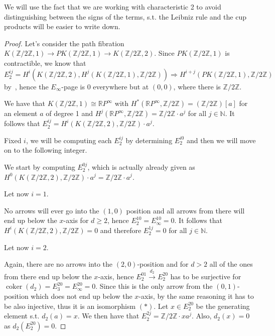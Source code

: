 \documentclass{article}
\newcommand{\numberset}{\mathbb}
\newcommand{\N}{\numberset{N}}
\newcommand{\Z}{\numberset{Z}}
\newcommand{\R}{\numberset{R}}
\newcommand{\RP}{\R P^\infty}
\newcommand{\exercise}[1]{\noindent {\bf Exercise #1}}
\DeclareMathOperator{\coker}{coker}
\begin{document}
\title{}

\author{Matteo Durante, s2303760, Leiden University}

\maketitle

\exercise{2}

    We will use the fact that we are working with characteristic 2 to avoid
    distinguishing between the signs of the terms, s.t. the Leibniz rule and the
    cup products will be easier to write down.

\begin{proof}
    Let's consider the path fibration $K(\Z/2\Z,1)\rightarrow
    PK(\Z/2\Z,1)\rightarrow K(\Z/2\Z,2)$. Since $PK(\Z/2\Z,1)$ is contractible,
    we know that $E^{ij}_2=H^i(K(\Z/2\Z,2),H^j(K(\Z/2\Z,1),\Z/2\Z))\Rightarrow
    H^{i+j}(PK(\Z/2\Z,1),\Z/2\Z)$ by~\cite[thm. 9.5]{HM19}, hence the
    $E_\infty$-page is 0 everywhere but at $(0,0)$, where there is $\Z/2\Z$.

    We have that $K(\Z/2\Z,1)\cong\RP$ with $H^*(\RP,\Z/2\Z)=(\Z/2\Z)[a]$ for an
    element $a$ of degree 1 and $H^j(\RP,\Z/2\Z)=\Z/2\Z\cdot a^j$ for all
    $j\in\N$. It follows that $E^{ij}_2=H^i(K(\Z/2\Z,2),\Z/2\Z)\cdot a^j$.

    Fixed $i$, we will be computing each $E^{ij}_2$ by determining $E^{i0}_2$
    and then we will move on to the following integer.

    We start by computing $E^{0j}_2$, which is actually already given as
    $H^0(K(\Z/2\Z,2),\Z/2\Z)\cdot a^j=\Z/2\Z\cdot a^j$.

    Let now $i=1$.
    
    No arrows will ever go into the $(1,0)$ position and all arrows from there
    will end up below the $x$-axis for $d\geq 2$, hence
    $E^{10}_2=E^{10}_\infty=0$. It follows that $H^i(K(\Z/2\Z,2),\Z/2\Z)=0$ and
    therefore $E^{1j}_2=0$ for all $j\in\N$.

    Let now $i=2$.

    Again, there are no arrows into the $(2,0)$-position and for $d>2$ all of
    the ones from there end up below the $x$-axis, hence
    $E^{01}_2\xrightarrow{d_2}E^{20}_2$ has to be surjective for
    $\coker(d_2)=E^{20}_3=E^{20}_\infty=0$. Since this is the only arrow from
    the $(0,1)$-position which does not end up below the $x$-axis, by the same
    reasoning it has to be also injective,
    thus it is an isomorphism $(*)$. Let $x\in E^{20}_2$ be the generating
    element s.t. $d_2(a)=x$. We then have that $E^{2j}_2=\Z/2\Z\cdot xa^j$.
    Also, $d_2(x)=0$ as $d_2(E^{20}_2)=0$.
    

\end{proof}
\end{document}
